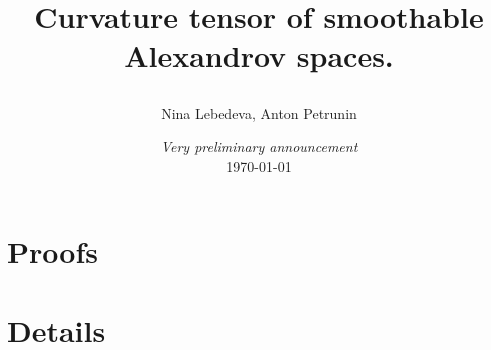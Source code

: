 \documentclass[a4paper,10pt]{article}
\begin{document}
\title{Curvature tensor of smoothable Alexandrov spaces. 
\date{{\it Very preliminary announcement} \\ \today}
}
\author{Nina Lebedeva, Anton Petrunin} 
\maketitle



\tableofcontents



\part{Proofs}










%

%
%
%
\part{Details}



\end{document}
